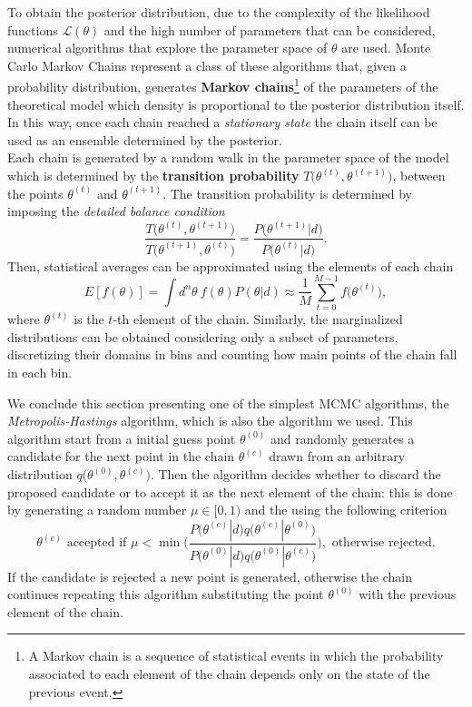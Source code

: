 To obtain the posterior distribution, due to the complexity of the likelihood functions $\mathcal L(\theta)$ and the high number of parameters that can be considered, numerical algorithms that explore the parameter space of $\theta$ are used. Monte Carlo Markov Chains represent a class of these algorithms that, given a probability distribution, generates \textbf{Markov chains}\footnote{A Markov chain is a sequence of statistical events in which the probability associated to each element of the chain depends only on the state of the previous event.} of the parameters of the theoretical model which density is proportional to the posterior distribution itself. In this way, once each chain reached a \emph{stationary state} the chain itself can be used as an ensemble determined by the posterior.\\
Each chain is generated by a random walk in the parameter space of the model which is determined by the \textbf{transition probability} $T\big(\theta^{(t)},\theta^{(t+1)}\big)$, between the points $\theta^{(t)}$ and $\theta^{(t+1)}$. The transition probability is determined by imposing the \emph{detailed balance condition}
$$\frac{T\big(\theta^{(t)},\theta^{(t+1)}\big)}{T\big(\theta^{(t+1)},\theta^{(t)}\big)}=\frac{P\big(\theta^{(t+1)}|d\big)}{P\big(\theta^{(t)}|d\big)}.$$
Then, statistical averages can be approximated using the elements of each chain
$$E[f(\theta)]=\int d^n\theta\ f(\theta)P(\theta|d)\approx\frac1M\sum_{t=0}^{M-1}f\big(\theta^{(t)}\big),$$
where $\theta^{(t)}$ is the $t$-th element of the chain. Similarly, the marginalized distributions can be obtained considering only a subset of parameters, discretizing their domains in bins and counting how main points of the chain fall in each bin.

We conclude this section presenting one of the simplest MCMC algorithms, the \emph{Metropolis-Hastings} algorithm, which is also the algorithm we used. This algorithm start from a initial guess point $\theta^{(0)}$ and randomly generates a candidate for the next point in the chain $\theta^{(c)}$ drawn from an arbitrary distribution $q\big(\theta^{(0)},\theta^{(c)}\big)$. Then the algorithm decides whether to discard the proposed candidate or to accept it as the next element of the chain: this is done by generating a random number $\mu\in[0,1)$ and the using the following criterion
\begin{equation}
    \theta^{(c)}\text{ accepted if }\mu<\min\Bigg(\frac{P\big(\theta^{(c)}|d\big)q\big(\theta^{(c)}|\theta^{(0)}\big)}{P\big(\theta^{(0)}|d\big)q\big(\theta^{(0)}|\theta^{(c)}\big)}\Bigg),\text{ otherwise rejected.}
\end{equation}
If the candidate is rejected a new point is generated, otherwise the chain continues repeating this algorithm substituting the point $\theta^{(0)}$ with the previous element of the chain.
